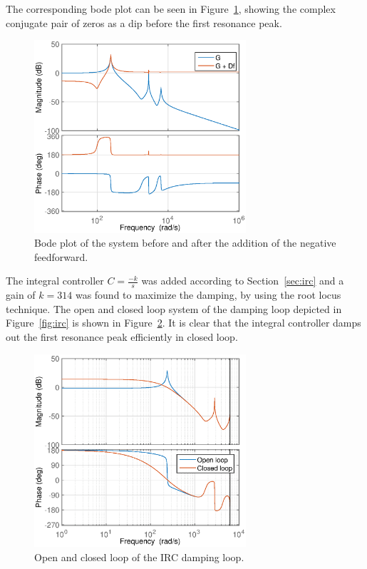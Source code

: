 The corresponding bode plot can be seen in Figure~\ref{fig:bodeafterfeedf}, showing the complex conjugate pair of zeros as a dip before the first resonance peak.

\begin{figure}[h!]
  \centering
  \includegraphics[width=0.7\textwidth]{fig/matlab/bodeafterfeedf.eps}
  \caption{\label{fig:bodeafterfeedf} Bode plot of the system before and after the addition of the negative feedforward.}
\end{figure}

The integral controller $C=\frac{-k}{s}$ was added according to Section~\ref{sec:irc} and a gain of $k=314$ was found to maximize the damping, by using the root locus technique.
The open and closed loop system of the \abbrIRC damping loop depicted in Figure~\ref{fig:irc} is shown in Figure~\ref{fig:bodedamped}. It is clear that the integral controller damps out the first resonance peak efficiently in closed loop.

\begin{figure}[h!]
  \centering
  \includegraphics[width=0.7\textwidth]{fig/matlab/bodedamped.eps}
  \caption{\label{fig:bodedamped} Open and closed loop of the IRC damping loop.}
\end{figure}

